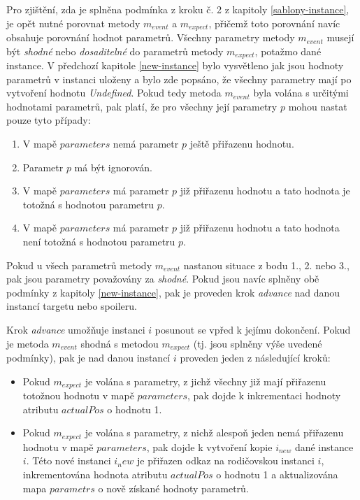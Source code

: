 Pro zjištění, zda je splněna podmínka z kroku č. 2 z kapitoly \ref{sablony-instance}, je opět nutné porovnat metody $m_{event}$ a $m_{expect}$, přičemž toto porovnání navíc obsahuje porovnání hodnot parametrů. Všechny parametry metody $m_{event}$ musejí být \textit{shodné} nebo \textit{dosaditelné} do parametrů metody $m_{expect}$, potažmo dané instance. V předchozí kapitole \ref{new-instance} bylo vysvětleno jak jsou hodnoty parametrů v instanci uloženy a bylo zde popsáno, že všechny parametry mají po vytvoření hodnotu \textit{Undefined}. Pokud tedy metoda $m_{event}$ byla volána s určitými hodnotami parametrů, pak platí, že pro všechny její parametry $p$ mohou nastat pouze tyto případy:

\begin{enumerate}
	\item V mapě $parameters$ nemá parametr $p$ ještě přiřazenu hodnotu.
	\item Parametr $p$ má být ignorován.
	\item V mapě $parameters$ má parametr $p$ již přiřazenu hodnotu a tato hodnota je totožná s hodnotou parametru $p$.
	\item V mapě $parameters$ má parametr $p$ již přiřazenu hodnotu a tato hodnota není totožná s hodnotou parametru $p$.
\end{enumerate}

Pokud u všech parametrů metody $m_{event}$ nastanou situace z bodu 1., 2. nebo 3., pak jsou parametry považovány za \textit{shodné}. Pokud jsou navíc splněny obě podmínky z kapitoly \ref{new-instance}, pak je proveden krok \textit{advance} nad danou instancí targetu nebo spoileru.

Krok \textit{advance} umožňuje instanci $i$ posunout se vpřed k jejímu dokončení. Pokud je metoda $m_{event}$ shodná s metodou $m_{expect}$ (tj. jsou splněny výše uvedené podmínky), pak je nad danou instancí $i$ proveden jeden z následující kroků:

\begin{itemize}
\item{Pokud $m_{expect}$ je volána s parametry, z jichž všechny již mají přiřazenu totožnou hodnotu v mapě $parameters$, pak dojde k inkrementaci hodnoty atributu $actualPos$ o hodnotu 1.}
\item{Pokud $m_{expect}$ je volána s parametry, z nichž alespoň jeden nemá přiřazenu hodnotu v mapě $parameters$, pak dojde k vytvoření kopie $i_{new}$ dané instance $i$. Této nové instanci $i_new$ je přiřazen odkaz na rodičovskou instanci $i$, inkrementována hodnota atributu $actualPos$ o hodnotu 1 a aktualizována mapa $parametrs$ o nově získané hodnoty parametrů.}
\end{itemize}

